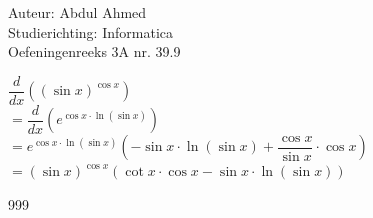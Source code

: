\documentclass[a4paper]{article}
\begin{document}
  
\noindent \large Auteur: Abdul Ahmed \\
\noindent \large Studierichting:  Informatica\\
\noindent \large Oefeningenreeks 3A nr. 39.9\\

\medskip

\normalsize

 
$\dfrac{d}{dx} \left((\sin x)^{\cos x}\right)$\\

$=\dfrac{d}{dx} \left(e^ {\cos x \cdot\ln(\sin x)}\right)$\\

$=e^ {\cos x \cdot\ln(\sin x)}\left(-\sin x \cdot \ln (\sin x) +\dfrac{\cos x}{\sin x} \cdot \cos x\right)$\\

$=(\sin x)^{\cos x}\left(\cot x \cdot \cos x -\sin x \cdot \ln (\sin x)\right)$\\














\begin{thebibliography}{999}
\end{thebibliography}
\end{document}
